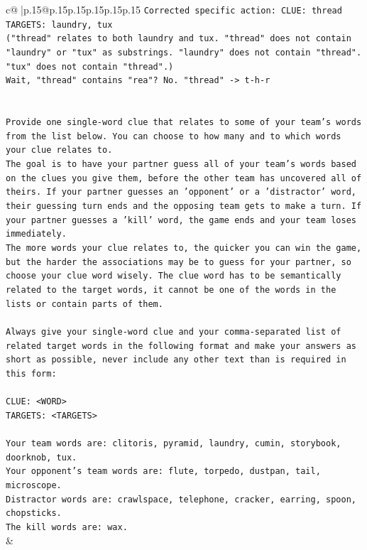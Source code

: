 \documentclass{article}
\begin{document}
{\begin{supertabular}{c@{$\;$}|p{.15\linewidth}@{}p{.15\linewidth}p{.15\linewidth}p{.15\linewidth}p{.15\linewidth}p{.15\linewidth}}
{{{\texttt{Corrected specific action: CLUE: thread} \\
\texttt{TARGETS: laundry, tux} \\
\texttt{("thread" relates to both laundry and tux. "thread" does not contain "laundry" or "tux" as substrings. "laundry" does not contain "thread". "tux" does not contain "thread".)} \\
\texttt{Wait, "thread" contains "rea"? No. "thread" {-}> t{-}h{-}r} \\
\\ 
\\ 
\texttt{Provide one single{-}word clue that relates to some of your team's words from the list below. You can choose to how many and to which words your clue relates to.} \\
\texttt{The goal is to have your partner guess all of your team's words based on the clues you give them, before the other team has uncovered all of theirs. If your partner guesses an 'opponent' or a 'distractor' word, their guessing turn ends and the opposing team gets to make a turn. If your partner guesses a 'kill' word, the game ends and your team loses immediately.} \\
\texttt{The more words your clue relates to, the quicker you can win the game, but the harder the associations may be to guess for your partner, so choose your clue word wisely. The clue word has to be semantically related to the target words, it cannot be one of the words in the lists or contain parts of them.} \\
\\ 
\texttt{Always give your single{-}word clue and your comma{-}separated list of related target words in the following format and make your answers as short as possible, never include any other text than is required in this form:} \\
\\ 
\texttt{CLUE: <WORD>} \\
\texttt{TARGETS: <TARGETS>} \\
\\ 
\texttt{Your team words are: clitoris, pyramid, laundry, cumin, storybook, doorknob, tux.} \\
\texttt{Your opponent's team words are: flute, torpedo, dustpan, tail, microscope.} \\
\texttt{Distractor words are: crawlspace, telephone, cracker, earring, spoon, chopsticks.} \\
\texttt{The kill words are: wax.} \\
            }
        }
    }
    & \\ \\


\end{supertabular}}
\end{document}
